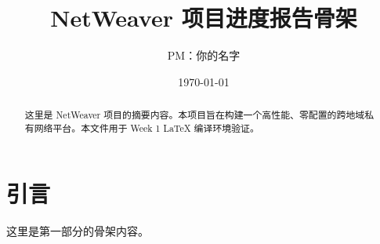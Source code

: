 \documentclass[UTF8]{ctexart}
\title{NetWeaver 项目进度报告骨架}
\author{PM：你的名字}
\date{\today}
\begin{document}
\maketitle

\begin{abstract}
这里是 NetWeaver 项目的摘要内容。本项目旨在构建一个高性能、零配置的跨地域私有网络平台。本文件用于 Week 1 LaTeX 编译环境验证。
\end{abstract}

\section{引言}
这里是第一部分的骨架内容。
\end{document}
